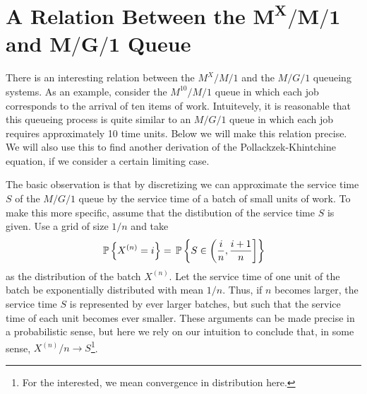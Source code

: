 \section
[A Relation Between the $M^X/M/1$ and $M/G/1$  Queue]
{A Relation Between the $\mathbf{M^X/M/1}$ and $\mathbf{M/G/1}$  Queue}
\label{sec:relat-batch-queu}


There is an interesting relation between the $M^X/M/1$ and the $M/G/1$
queueing systems. As an example, consider the $M^{10}/M/1$ queue in
which each job corresponds to the arrival of ten items of
work. Intuitevely, it is reasonable that this queueing process is
quite similar to an $M/G/1$ queue in which each job requires
approximately 10 time units. Below we will make this relation
precise. We will also use this to find another derivation of the
Pollackzek-Khintchine equation, if we consider a certain limiting
case.


The basic observation is that by discretizing we can approximate the
service time $S$ of the $M/G/1$ queue by the service time of a batch
of small units of work. To make this more specific, assume that the
distibution of the service time $S$ is given. Use a grid of size $1/n$
and take
\begin{equation}\label{eq:69}
  \P{X^{(n)} = i} = \P{ S\in\left(\frac in, \frac{i+1}n\right]}
\end{equation}
as the distribution of the batch $X^{(n)}$. Let the service time of
one unit of the batch be exponentially distributed with mean $1/n$.
Thus, if $n$ becomes larger, the service time $S$ is represented by
ever larger batches, but such that the service time of each unit
becomes ever smaller. These arguments can be made precise in a
probabilistic sense, but here we rely on our intuition to conclude
that, in some sense, $X^{(n)}/n \to S$\footnote{For the interested, we mean convergence in distribution here.}. 

